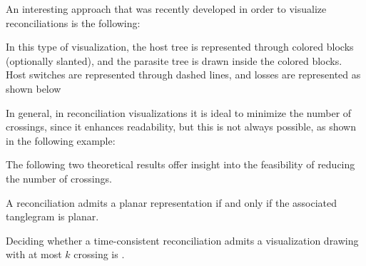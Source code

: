 \documentclass[a4paper, 12pt]{report}
\begin{document}
    An interesting approach that was recently developed in order to visualize reconciliations is the following:


    In this type of visualization, the host tree is represented through colored blocks (optionally slanted), and the parasite tree is drawn inside the colored blocks. Host switches are represented through dashed lines, and losses are represented as shown below


    In general, in reconciliation visualizations it is ideal to minimize the number of crossings, since it enhances readability, but this is not always possible, as shown in the following example:


    The following two theoretical results offer insight into the feasibility of reducing the number of crossings.

    \begin{framedthm}{}
        A reconciliation admits a planar representation if and only if the associated tanglegram is planar.
    \end{framedthm}


    \begin{framedthm}{}
        Deciding whether a time-consistent reconciliation admits a visualization drawing with at most $k$ crossing is \NPComplete.
    \end{framedthm}

    \printbibliography
\end{document}
